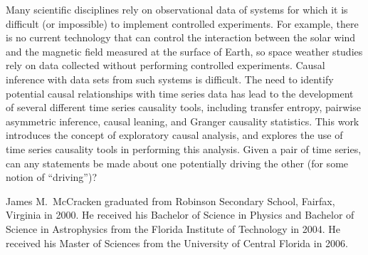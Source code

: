 \documentclass[11pt]{report}
\begin{document}
\abstractpage
Many scientific disciplines rely on observational data of systems for which it is difficult (or impossible) to implement controlled experiments. For example, there is no current technology that can control the interaction between the solar wind and the magnetic field measured at the surface of Earth, so space weather studies rely on data collected without performing controlled experiments.  Causal inference with data sets from such systems is difficult.   The need to identify potential causal relationships with time series data has lead to the development of several different time series causality tools, including transfer entropy, pairwise asymmetric inference, causal leaning, and Granger causality statistics.  This work introduces the concept of exploratory causal analysis, and explores the use of time series causality tools in performing this analysis.  Given a pair of time series, can any statements be made about one potentially driving the other (for some notion of ``driving'')? 
\pagebreak

\renewcommand{\thepage}{\arabic{page}}
\setcounter{chapter}{0}
\setcounter{page}{1}

  




\cvpage

James M.\ McCracken graduated from Robinson Secondary School, Fairfax, Virginia in 2000.  He received his Bachelor of Science in Physics and Bachelor of Science in Astrophysics from the Florida Institute of Technology in 2004.  He received his Master of Sciences from the University of Central Florida in 2006. 
\end{document}
